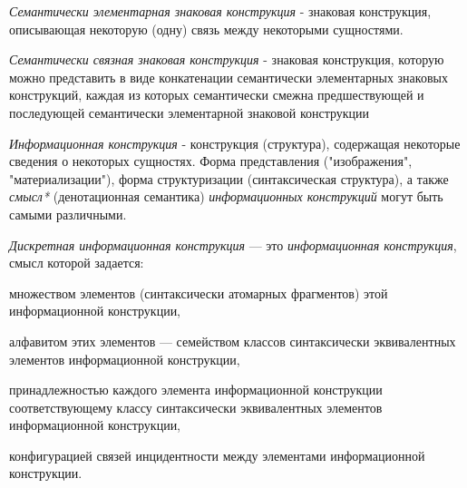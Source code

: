 \begin{SCn}


\end{SCn}

\textit{Семантически элементарная знаковая конструкция} - знаковая конструкция, описывающая некоторую (одну) связь между некоторыми сущностями.

\textit{Семантически связная знаковая конструкция} - знаковая конструкция, которую можно представить в виде конкатенации семантически элементарных знаковых конструкций, каждая из которых семантически смежна предшествующей и последующей семантически элементарной знаковой конструкции

\begin{SCn}

    \begin{scnindent}
    \end{scnindent}
    \begin{scnindent}
    \end{scnindent}

\end{SCn}

\textit{Информационная конструкция} - конструкция (структура), содержащая некоторые сведения о некоторых сущностях.
Форма представления ("изображения"{}, "материализации"{}), форма структуризации (синтаксическая структура), а также \textit{смысл*} (денотационная семантика) \textit{информационных конструкций} могут быть самыми различными.

\textit{Дискретная информационная конструкция} — это \textit{информационная конструкция}, смысл которой задается:
\begin{textitemize}
    \item множеством элементов (синтаксически атомарных фрагментов) этой информационной конструкции,
    \item алфавитом этих элементов — семейством классов синтаксически эквивалентных элементов информационной конструкции,
    \item принадлежностью каждого элемента информационной конструкции соответствующему классу синтаксически эквивалентных элементов информационной конструкции,
    \item конфигурацией связей инцидентности между элементами информационной конструкции.
\end{textitemize}

